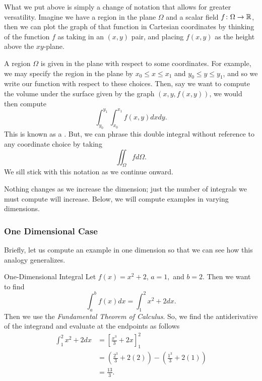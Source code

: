                 What we put above is simply a change of notation that allows for greater versatility.  Imagine we have a region in the plane $\Omega$ and a scalar field $f\colon \Omega \to \mathbb{R}$, then we can plot the graph of that function in Cartesian coordinates by thinking of the function $f$ as taking in an $(x,y)$ pair, and placing $f(x,y)$ as the height above the $xy$-plane.
                \begin{figure}[H]
                	\centering
                	\def\svgwidth{0.75\columnwidth}
                	
                \end{figure}
                A region $\Omega$ is given in the plane with respect to some coordinates.  For example, we may specify the region in the plane by $x_0 \leq x \leq x_1$ and $y_0 \leq y \leq y_1$, and so we write our function with respect to these choices.  Then, say we want to compute the volume under the surface given by the graph $(x,y,f(x,y))$, we would then compute
                \[
                \int_{y_0}^{y_1} \int_{x_0}^{x_1} f(x,y)dxdy.
                \]
                This is known as a .  But, we can phrase this double integral without reference to any coordinate choice by taking
                \[
                \iint_\Omega f d\Omega.
                \]
             	We sill stick with this notation as we continue onward.
             	
             	Nothing changes as we increase the dimension; just the number of integrals we must compute will increase.  Below, we will compute examples in varying dimensions.
             	
             	
             	        
             	        \subsubsection{One Dimensional Case}
             	        Briefly, let us compute an example in one dimension so that we can see how this analogy generalizes.
             	        
             	        \begin{ex}{One-Dimensional Integral}
             	        Let $f(x) = x^2+2$, $a=1,$ and $b=2$. Then we want to find
             	        \[
             	        \int_a^b f(x)dx = \int_1^2 x^2+2dx.
             	        \]
             	        Then we use the \emph{Fundamental Theorem of Calculus}. So, we find the antiderivative of the integrand and evaluate at the endpoints as follows
             	        \begin{align*}
             	            \int_1^2 x^2+2dx &= \left[ \frac{x^3}{3}+2x\right]_1^2\\
             	            &= \left(\frac{2^3}{3}+2(2)\right) - \left( \frac{1^3}{3}+2(1)\right)\\
             	            &= \frac{13}{3}.
             	        \end{align*}
             	        \end{ex}
             	        
